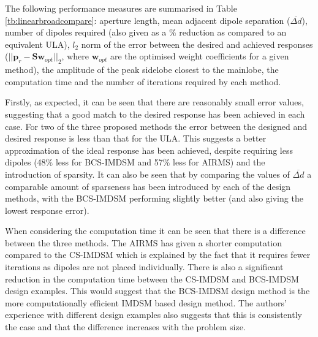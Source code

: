 \documentclass[10pt,final]{IEEEtran}
\begin{document}
The following performance measures are summarised in Table \ref{tb:linearbroadcompare}: aperture length, mean adjacent dipole separation ($\overline{\Delta{d}}$), number of dipoles required (also given as a $\%$ reduction as compared to an equivalent ULA), $l_{2}$ norm of the error between the desired and achieved responses ($||\textbf{p}_{r}-\textbf{Sw}_{opt}||_{2}$, where $\textbf{w}_{opt}$ are the optimised weight coefficients for a given method), the amplitude of the peak sidelobe closest to the mainlobe, the computation time and the number of iterations required by each method.

Firstly, as expected, it can be seen that there are reasonably small error values, suggesting that a good match to the desired response has been achieved in each case.  For two of the three proposed methods the error between the designed and desired response is less than that for the ULA.  This suggests a better approximation of the ideal response has been achieved, despite requiring less dipoles (48$\%$ less for BCS-IMDSM and 57$\%$ less for AIRMS) and the introduction of sparsity.  It can also be seen that by comparing the values of $\overline{\Delta{d}}$ a comparable amount of sparseness has been introduced by each of the design methods, with the BCS-IMDSM performing slightly better (and also giving the lowest response error).

When considering the computation time it can be seen that there is a difference between the three methods.  The AIRMS has given a shorter computation compared to the CS-IMDSM which is explained by the fact that it requires fewer iterations as dipoles are not placed individually.  There is also a significant reduction in the computation time between the CS-IMDSM and BCS-IMDSM design examples.  This would suggest that the BCS-IMDSM design method is the more computationally efficient IMDSM based design method.  The authors' experience with different design examples also suggests that this is consistently the case and that the difference increases with the problem size.
\end{document}
